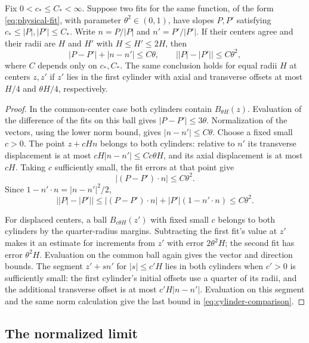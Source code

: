 \begin{lemma}\label{lem:cylinder-comparison}
Fix $0<c_*\le C_*<\infty$. Suppose two fits for the same function, of the form \eqref{eq:physical-fit}, with parameter $\theta^2\in(0,1)$, have slopes $P,P'$ satisfying $c_*\le |P|,|P'|\le C_*$. Write $n=P/|P|$ and $n'=P'/|P'|$. If their centers agree and their radii are $H$ and $H'$ with $H\le H'\le2H$, then
\begin{equation}\label{eq:cylinder-comparison}
  |P-P'|+|n-n'|\le C\theta,\qquad
  \bigl||P|-|P'|\bigr|\le C\theta^2,
\end{equation}
where $C$ depends only on $c_*,C_*$. The same conclusion holds for equal radii $H$ at centers $z,z'$ if $z'$ lies in the first cylinder with axial and transverse offsets at most $H/4$ and $\theta H/4$, respectively.
\end{lemma}

\begin{proof}
In the common-center case both cylinders contain $B_{\theta H}(z)$. Evaluation of the difference of the fits on this ball gives $|P-P'|\le3\theta$. Normalization of the vectors, using the lower norm bound, gives $|n-n'|\le C\theta$. Choose a fixed small $c>0$. The point $z+cHn$ belongs to both cylinders: relative to $n'$ its transverse displacement is at most $cH|n-n'|\le Cc\theta H$, and its axial displacement is at most $cH$. Taking $c$ sufficiently small, the fit errors at that point give
\[
  |(P-P')\cdot n|\le C\theta^2.
\]
Since $1-n'\cdot n=|n-n'|^2/2$,
\[
  \bigl||P|-|P'|\bigr|
   \le |(P-P')\cdot n|+|P'|(1-n'\cdot n)\le C\theta^2.
\]

For displaced centers, a ball $B_{c\theta H}(z')$ with fixed small $c$ belongs to both cylinders by the quarter-radius margins. Subtracting the first fit's value at $z'$ makes it an estimate for increments from $z'$ with error $2\theta^2H$; the second fit has error $\theta^2H$. Evaluation on the common ball again gives the vector and direction bounds. The segment $z'+s n'$ for $|s|\le c'H$ lies in both cylinders when $c'>0$ is sufficiently small: the first cylinder's initial offsets use a quarter of its radii, and the additional transverse offset is at most $c'H|n-n'|$. Evaluation on this segment and the same norm calculation give the last bound in \eqref{eq:cylinder-comparison}.
\end{proof}

\subsection{The normalized limit}

